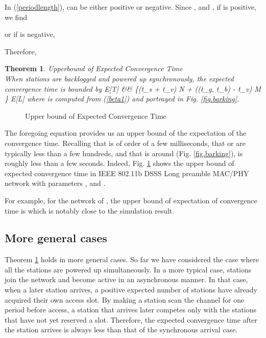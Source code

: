 \documentclass{acm_proc_article-sp}
\newtheorem{theorem}{Theorem}
\newcommand{\be}{}
\begin{document}
In (\ref{periodlength}),  can be either positive or negative. Since ,  and , if  is positive, we find

or if  is negative,

Therefore,
\begin{theorem}{Upperbound of Expected Convergence Time}\\
\label{thm.upperbound}
When stations are backlogged and powered up synchronously, the expected convergence time is bounded by
\be \label{eqn.bound} E[T] &\leq& \left\{(t_s + t_v) N + (\max(t_g, t_b) - t_v) M \right\} E[L] \ee
where  is computed from (\ref{beta1}) and portrayed in Fig. \ref{fig.barking}.
\end{theorem}
\begin{figure}
   \begin{center}
   \end{center}
   \begin{center}
   \caption{Upper bound of Expected Convergence Time}
   \label{fig.upperbound}
   \end{center}
\vspace{-0.2in}
\end{figure}
The foregoing equation provides us an upper bound of the expectation of the convergence time. Recalling that  is of order of a few milliseconds, that  or  are typically less than a few hundreds, and that  is around  (Fig. \ref{fig.barking}),  is roughly less than a few seconds. Indeed, Fig. \ref{fig.upperbound} shows the upper bound of expected convergence time in IEEE 802.11b DSSS Long preamble MAC/PHY network with parameters , and .

For example, for the network of , the upper bound of expectation of convergence time is  which is notably close to the simulation result.




\subsection{More general cases}
Theorem \ref{thm.upperbound} holds in more general cases. So far we have considered the case where all the stations are powered up simultaneously. In a more typical case, stations join the network and become active in an asynchronous manner. In that case, when a later station arrives, a positive expected number of stations have already acquired their own access slot. By making a station scan the channel for one period before access, a station that arrives later competes only with the stations that have not yet reserved a slot. Therefore, the expected convergence time after the station arrives is always less than that of the synchronous arrival case.
\end{document}
